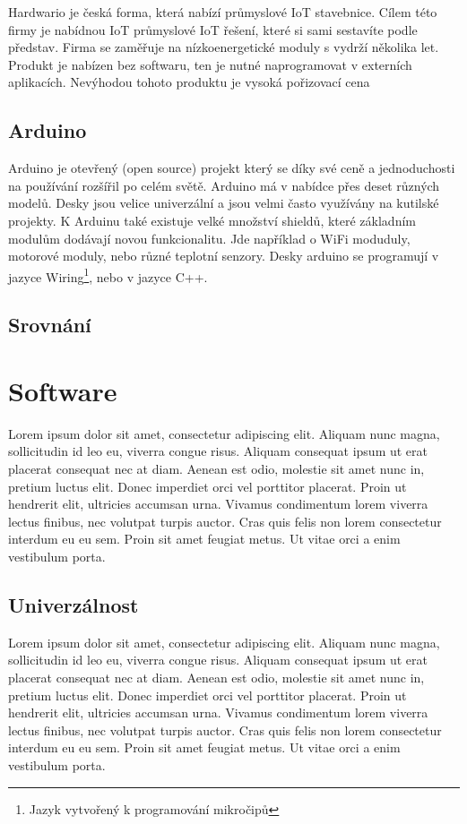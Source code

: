 Hardwario\cite{HARDWARIO} je česká forma, která nabízí průmyslové IoT stavebnice.
Cílem této firmy je nabídnou IoT průmyslové IoT řešení, které si sami sestavíte podle představ.
Firma se zaměřuje na nízkoenergetické moduly s vydrží několika let.
Produkt je nabízen bez softwaru, ten je nutné naprogramovat v externích aplikacích.
Nevýhodou tohoto produktu je vysoká pořizovací cena





\subsection{Arduino}
Arduino \cite{ARDUGREENHOUSE} je otevřený (open source) projekt který se díky své ceně a jednoduchosti na používání rozšířil po celém světě.
Arduino má v nabídce přes deset různých modelů. Desky jsou velice univerzální a jsou velmi často využívány na kutilské projekty.
K Arduinu také existuje velké množství shieldů, které základním modulům dodávají novou funkcionalitu. 
Jde například o WiFi moduduly, motorové moduly, nebo různé teplotní senzory.
Desky arduino se programují v jazyce Wiring\footnote{Jazyk vytvořený k programování mikročipů}, nebo v jazyce C++. 

\fxnote[author=JA]{\textcolor{mygreen}{Obrázek Arduina}}


\subsection{Srovnání}



\section{Software}
Lorem ipsum dolor sit amet, consectetur adipiscing elit.
Aliquam nunc magna, sollicitudin id leo eu, viverra congue risus.
Aliquam consequat ipsum ut erat placerat consequat nec at diam. 
Aenean est odio, molestie sit amet nunc in, pretium luctus elit. 
Donec imperdiet orci vel porttitor placerat. 
Proin ut hendrerit elit, ultricies accumsan urna. 
Vivamus condimentum lorem viverra lectus finibus, nec volutpat turpis auctor.
Cras quis felis non lorem consectetur interdum eu eu sem. 
Proin sit amet feugiat metus. 
Ut vitae orci a enim vestibulum porta. 


\subsection{Univerzálnost}
Lorem ipsum dolor sit amet, consectetur adipiscing elit.
Aliquam nunc magna, sollicitudin id leo eu, viverra congue risus.
Aliquam consequat ipsum ut erat placerat consequat nec at diam. 
Aenean est odio, molestie sit amet nunc in, pretium luctus elit. 
Donec imperdiet orci vel porttitor placerat. 
Proin ut hendrerit elit, ultricies accumsan urna. 
Vivamus condimentum lorem viverra lectus finibus, nec volutpat turpis auctor.
Cras quis felis non lorem consectetur interdum eu eu sem. 
Proin sit amet feugiat metus. 
Ut vitae orci a enim vestibulum porta. 
\newpage